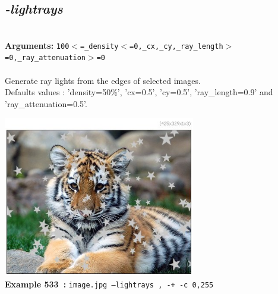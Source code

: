 \documentclass[a4paper,11pt,twoside]{book}
\begin{document}
\subsection{\emph{-lightrays} }\vspace*{-0.5em}
~\\\textbf{Arguments: } 
{\small \texttt{100$<$=\_density$<$=0,\_cx,\_cy,\_ray\_length$>$=0,\_ray\_attenuation$>$=0}}\\~\\
Generate ray lights from the edges of selected images.
~\\Defaults values : 'density=50\%', 'cx=0.5', 'cy=0.5', 'ray\_length=0.9' and 'ray\_attenuation=0.5'.
\begin{center}\includegraphics[keepaspectratio=true,height=7cm,width=\textwidth]{img/gmic_def533.jpg}\\
{\footnotesize \textbf{Example 533~:} \texttt{image.jpg --lightrays , -+ -c 0,255}}
\end{center}
\end{document}
